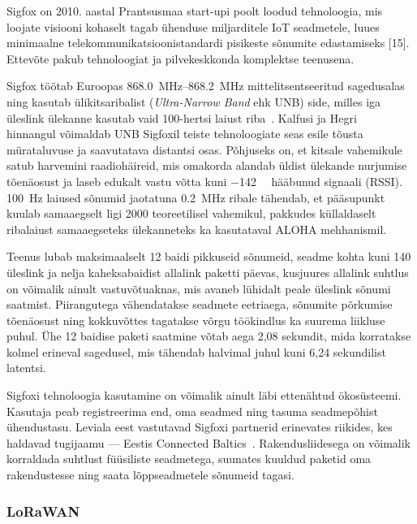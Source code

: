 \documentclass[12pt]{article}
\begin{document}
    Sigfox on 2010. aastal Prantsusmaa start-upi poolt loodud tehnoloogia, mis loojate visiooni kohaselt tagab ühenduse miljarditele IoT seadmetele, luues minimaalne telekommunikatsioonistandardi pisikeste sõnumite edastamiseks [15].
    Ettevõte pakub tehnoloogiat ja pilvekeskkonda komplektse teenusena.

    Sigfox töötab Euroopas \SIrange{868.0}{868.2}{\mega\hertz} mittelitsentseeritud sagedusalas ning kasutab ülikitsaribalist (\textit{Ultra-Narrow Band} ehk UNB) side, milles iga üleslink ülekanne kasutab vaid 100-hertsi laiust riba~\cite{sigfoxtech}.
    Kalfusi ja Hegri~\cite{kalfus2016ultra} hinnangul võimaldab UNB Sigfoxil teiste tehnoloogiate seas esile tõusta mürataluvuse ja saavutatava distantsi osas.
    Põhjuseks on, et kitsale vahemikule satub harvemini raadiohäireid, mis omakorda alandab üldist ülekande nurjumise tõenäosust ja laseb edukalt vastu võtta kuni \SI{-142}{\deci\belm} hääbunud signaali (RSSI).
    \SI{100}{\hertz} laiused sõnumid jaotatuna \SI{0,2}{\mega\hertz} ribale tähendab, et pääsupunkt kuulab samaaegselt ligi 2000 teoreetilisel vahemikul, pakkudes küllaldaselt ribalaiust samaaegseteks ülekanneteks ka kasutataval ALOHA mehhanismil.

    Teenus lubab maksimaalselt 12 baidi pikkuseid sõnumeid, seadme kohta kuni 140 üleslink ja nelja kaheksabaidist allalink paketti päevas, kusjuures allalink suhtlus on võimalik ainult vastuvõtuaknas, mis avaneb lühidalt peale üleslink sõnumi saatmist.
    Piirangutega vähendatakse seadmete eetriaega, sõnumite põrkumise tõenäosust ning kokkuvõttes tagatakse võrgu töökindlus ka suurema liikluse puhul.
    Ühe 12 baidise paketi saatmine võtab aega 2,08 sekundit, mida korratakse kolmel erineval sagedusel, mis tähendab halvimal juhul kuni 6,24 sekundilist latentsi.

    Sigfoxi tehnoloogia kasutamine on võimalik ainult läbi ettenähtud ökosüsteemi.
    Kasutaja peab registreerima end, oma seadmed ning tasuma seadmepõhist ühendustasu.
    Leviala eest vastutavad Sigfoxi partnerid erinevates riikides, kes haldavad tugijaamu — Eestis Connected Baltics~\cite{sfCoverage}.
    Rakendusliidesega on võimalik korraldada suhtlust füüsiliste seadmetega, suunates kuuldud paketid oma rakendustesse ning saata lõppseadmetele sõnumeid tagasi.

    \subsubsection{LoRaWAN}
\end{document}
